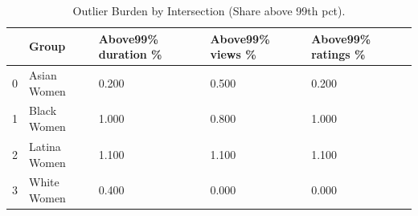 \begin{table}[htbp]
\centering
\caption{Outlier Burden by Intersection (Share above 99th pct).}
\label{tab:eda_outlier_burden}
\begin{tabular}{lllll}
\toprule
 & Group & Above99\% duration \% & Above99\% views \% & Above99\% ratings \% \\
\midrule
0 & Asian Women & 0.200 & 0.500 & 0.200 \\
1 & Black Women & 1.000 & 0.800 & 1.000 \\
2 & Latina Women & 1.100 & 1.100 & 1.100 \\
3 & White Women & 0.400 & 0.000 & 0.000 \\
\bottomrule
\end{tabular}

\end{table}